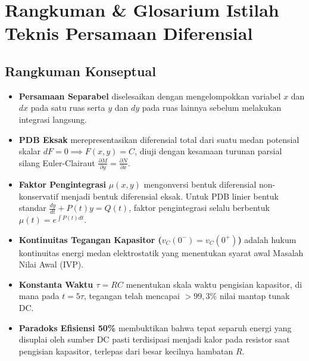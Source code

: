 \documentclass[11pt,a4paper]{article}
\theoremstyle{definition}
\begin{document}
\section{Rangkuman \& Glosarium Istilah Teknis Persamaan Diferensial}

\subsection{Rangkuman Konseptual}
\begin{itemize}
    \item \textbf{Persamaan Separabel} diselesaikan dengan mengelompokkan variabel $x$ dan $dx$ pada satu ruas serta $y$ dan $dy$ pada ruas lainnya sebelum melakukan integrasi langsung.
    \item \textbf{PDB Eksak} merepresentasikan diferensial total dari suatu medan potensial skalar $dF = 0 \implies F(x,y) = C$, diuji dengan kesamaan turunan parsial silang Euler-Clairaut $\frac{\partial M}{\partial y} = \frac{\partial N}{\partial x}$.
    \item \textbf{Faktor Pengintegrasi} $\mu(x,y)$ mengonversi bentuk diferensial non-konservatif menjadi bentuk diferensial eksak. Untuk PDB linier bentuk standar $\frac{dy}{dt} + P(t)y = Q(t)$, faktor pengintegrasi selalu berbentuk $\mu(t) = e^{\int P(t) dt}$.
    \item \textbf{Kontinuitas Tegangan Kapasitor ($v_C(0^-) = v_C(0^+)$)} adalah hukum kontinuitas energi medan elektrostatik yang menentukan syarat awal Masalah Nilai Awal (IVP).
    \item \textbf{Konstanta Waktu $\tau = RC$} menentukan skala waktu pengisian kapasitor, di mana pada $t = 5\tau$, tegangan telah mencapai $>99{,}3\%$ nilai mantap tunak DC.
    \item \textbf{Paradoks Efisiensi 50\%} membuktikan bahwa tepat separuh energi yang disuplai oleh sumber DC pasti terdisipasi menjadi kalor pada resistor saat pengisian kapasitor, terlepas dari besar kecilnya hambatan $R$.
\end{itemize}
\end{document}
